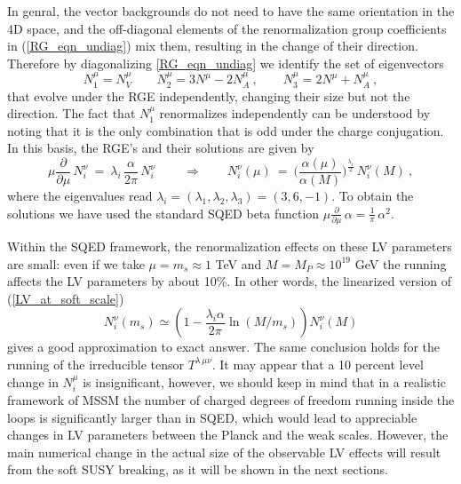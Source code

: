 \documentclass[12pt]{revtex4}
\begin{document}
In genral, the vector backgrounds do not need to have  the same orientation in the
4D space, and the off-diagonal elements of the renormalization group coefficients 
in (\ref{RG_eqn_undiag}) mix them, resulting in the change of their direction. 
Therefore by diagonalizing \eqref{RG_eqn_undiag} we identify the set of eigenvectors 
\begin{equation*}
N_1^\mu = N^\mu_V
\qquad 
N_2^\mu = 3 N^\mu - 2 N^\mu_A~,
\qquad 
N_3^\mu = 2 N^\mu + N^\mu_A~,
\end{equation*} 
that evolve under the RGE independently, 
changing their size but not the direction. The fact that
$N_1^\mu$ renormalizes independently can be understood by noting 
that it is the only combination that is odd under the charge conjugation.
In this basis, the RGE's and their solutions are given by 
\begin{equation} 
\mu \frac{\partial}{\partial\mu} \, N_i^\nu 
~=~ \lambda_i\, \frac { \alpha}{2 \pi} \, N_i^\nu~ 
\qquad \Rightarrow \qquad 
N_i^\nu(\mu) ~=~ 
\Big(  \frac {\alpha(\mu)}{\alpha(M)} \Big)^{\frac {\lambda_i}2} \, 
N_i^\nu(M)~, 
\label{LV_at_soft_scale}
\end{equation} 
where the eigenvalues read 
$\lambda_i = (\lambda_1, \lambda_2, \lambda_3) = (3, 6, -1)$. 
To obtain the solutions we have used the standard SQED beta function  
\( 
\mu \frac{\partial}{\partial\mu} \, \alpha = \frac 1{\pi} \,
\alpha^2.  
\) 


Within the SQED framework, the renormalization effects 
on these LV parameters are small: 
even if we take $\mu = m_{s} \approx 1$ TeV and 
$M = M_P \approx 10^{19}$ GeV the running affects the LV parameters by
about 10\%. In other words, the linearized version of (\ref{LV_at_soft_scale}) 
\begin{equation}
N_i^\nu(m_s) \simeq \left(1- \frac{\lambda_i\alpha}{2\pi}\ln(M/m_s)\right)N_i^\nu(M)
\label{simplified}
\end{equation}
gives a good approximation to exact answer. 
The same conclusion holds for the running of the
irreducible tensor $T^{\lambda\, \mu\nu}$. 
It may appear that a  10 percent level change in $N_i^\mu$ is
insignificant, however, we should keep in mind that in a 
realistic framework of MSSM the number of charged degrees of 
freedom running inside the loops is significantly larger than in SQED, 
which would lead to appreciable changes in LV parameters 
between the Planck and the weak scales.  
However, the main numerical change in the actual size of the observable 
LV effects will result from the soft SUSY breaking, as it will be shown in the next
sections. 
\end{document}

